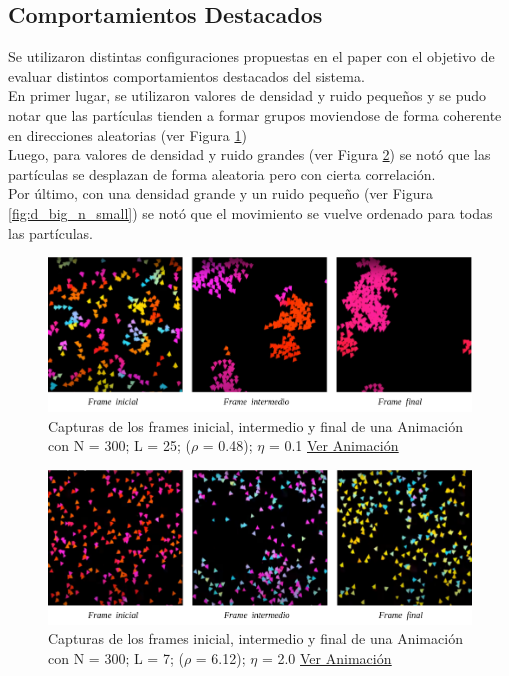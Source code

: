 \documentclass[12pt, a4paper]{report}
\begin{document}
\subsection{Comportamientos Destacados}

Se utilizaron distintas configuraciones propuestas en el paper \cite{vicsek1995novel} con el objetivo de evaluar distintos comportamientos destacados del sistema.\\

En primer lugar, se utilizaron valores de densidad y ruido pequeños y se pudo notar que las partículas tienden a formar grupos moviendose de forma coherente en direcciones aleatorias (ver Figura \ref{fig:d_n_small})\\  

Luego, para valores de densidad y ruido grandes (ver Figura \ref{fig:d_n_big}) se notó que las partículas se desplazan de forma aleatoria pero con cierta correlación.\\

Por último, con una densidad grande y un ruido pequeño (ver Figura \ref{fig:d_big_n_small}) se notó que el movimiento se vuelve ordenado para todas las partículas.
 
\begin{figure}[h]
\includegraphics[scale=0.4]{d_n_small.png}
\centering 
\caption{Capturas de los frames inicial, intermedio y final de una Animación con  N = 300; L = 25;	($\rho$ = 0.48); $\eta$ = 0.1 \href{https://www.youtube.com/watch?v=V2oRjjUPpmY}{\underline{Ver Animación}}} 
\label{fig:d_n_small}
\end{figure}


\begin{figure}[h]
\includegraphics[scale=0.4]{d_n_big.png}
\centering 
\caption{Capturas de los frames inicial, intermedio y final de una Animación con N = 300; L = 7; ($\rho$ = 6.12); $\eta$ = 2.0 \href{https://www.youtube.com/watch?v=t88TD__ushc}{\underline{Ver Animación}}} 
\label{fig:d_n_big}
\end{figure}
\end{document}

